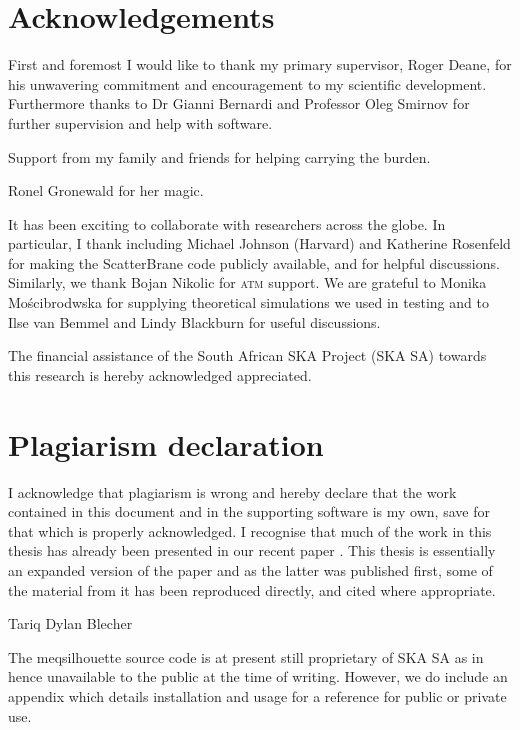
 
\chapter*{Acknowledgements}
First and foremost I would like to thank my primary supervisor, Roger Deane, for his unwavering commitment and encouragement to my scientific development. Furthermore thanks to Dr Gianni Bernardi and Professor Oleg Smirnov for further supervision and help with software. 


Support from my family and friends for helping carrying the burden.


Ronel Gronewald for her magic. 

It has been exciting to collaborate with researchers across the globe. In particular, I thank   including Michael Johnson (Harvard) and Katherine Rosenfeld for making the {\sc ScatterBrane} code publicly available, and for helpful discussions. Similarly, we thank Bojan Nikolic for \textsc{atm} support. We are grateful to Monika Mo\'{s}cibrodwska for supplying theoretical simulations we used in testing and to Ilse van Bemmel and Lindy Blackburn for useful discussions. 


The financial assistance of the South African SKA Project (SKA SA) towards this research is hereby acknowledged appreciated. 

\chapter*{Plagiarism declaration}
 I acknowledge that plagiarism is wrong and hereby declare that the work contained in this document and in the supporting software is my own, save for that which is properly acknowledged. I recognise that much of the work in this thesis has already been presented in our recent paper \citet{Blecher_2016}. This thesis is essentially an expanded version of the paper and as the latter was published first, some of the material from it has been reproduced directly, and cited where appropriate. 
 \vspace{55pt}
 
Tariq Dylan Blecher
 \clearpage
  \vspace*{\fill}
    \begin{center}
     \huge
     The {\sc meqsilhouette} source code is at present still proprietary of SKA SA as in hence unavailable to the public at the time of writing. However, we do include an appendix which details installation and usage for a reference for public or private use.
    \end{center}
  \vspace*{\fill}
\tableofcontents
{}
\listoffigures
{}
\listoftables
{}
